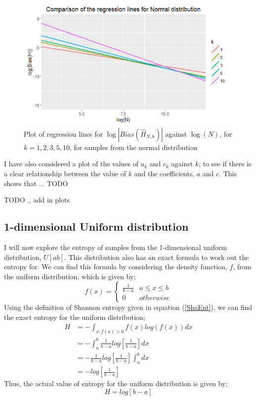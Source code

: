\documentclass{article}
\begin{document}
\begin{figure}
  \begin{center}
    \includegraphics[width=\textwidth]{./Graphs/Normal_comparison.png}
  \end{center}
\caption{Plot of regression lines for $\log|Bias(\hat{H}_{N, k})|$ against $\log(N)$, for $k=1, 2, 3, 5, 10$, for samples from the normal distribution}
  \label{normal_comparison_graph}
\end{figure}

I have also considered a plot of the values of $a_{k}$ and $c_{k}$ against $k$, to see if there is a clear relationship between the value of $k$ and the coefficients, $a$ and $c$. This shows that ... TODO

TODO .. add in plots 





\subsection{1-dimensional Uniform distribution}

I will now explore the entropy of samples from the 1-dimensional uniform distribution, $U[a b]$. This distribution also has an exact formula to work out the entropy for. We can find this formula by considering the density function, $f$, from the uniform distribution, which is given by;
\[
f(x) =  \begin{cases} 
      \frac{1}{b-a} & a \leq x \leq b \\
      0 & otherwise
   \end{cases}
\]
Using the definition of Shannon entropy given in equation (\ref{ShaEnt}), we can find the exact entropy for the uniform distribution;
\begin{align*}
H &= - \int_{x : f(x) > 0} f(x) log(f(x)) dx \\ 
&= - \int_{a}^{b} \frac{1}{b-a} log \left[ \frac{1}{b-a} \right] dx  \\
&= - \frac{1}{b-a} log \left[ \frac{1}{b-a} \right]  \int_{a}^{b} dx  \\
&= -  log  \left[ \frac{1}{b-a} \right] 
\end{align*}
Thus, the actual value of entropy for the uniform distribution is given by;
\begin{equation} \label{UnifEnt}
H = log [ b-a ]
\end{equation}
\end{document}
